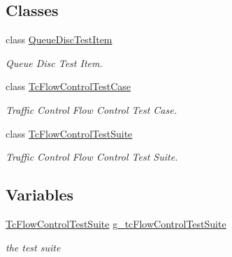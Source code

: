 \subsection*{Classes}
\begin{DoxyCompactItemize}
\item 
class \hyperlink{classQueueDiscTestItem}{Queue\+Disc\+Test\+Item}
\begin{DoxyCompactList}\small\item\em Queue Disc Test Item. \end{DoxyCompactList}\item 
class \hyperlink{classTcFlowControlTestCase}{Tc\+Flow\+Control\+Test\+Case}
\begin{DoxyCompactList}\small\item\em Traffic Control Flow Control Test Case. \end{DoxyCompactList}\item 
class \hyperlink{classTcFlowControlTestSuite}{Tc\+Flow\+Control\+Test\+Suite}
\begin{DoxyCompactList}\small\item\em Traffic Control Flow Control Test Suite. \end{DoxyCompactList}\end{DoxyCompactItemize}
\subsection*{Variables}
\begin{DoxyCompactItemize}
\item 
\hyperlink{classTcFlowControlTestSuite}{Tc\+Flow\+Control\+Test\+Suite} \hyperlink{group__traffic-control-test_ga8763012d5b6697cbfb3b26738cf3f884}{g\+\_\+tc\+Flow\+Control\+Test\+Suite}
\begin{DoxyCompactList}\small\item\em the test suite \end{DoxyCompactList}\end{DoxyCompactItemize}
